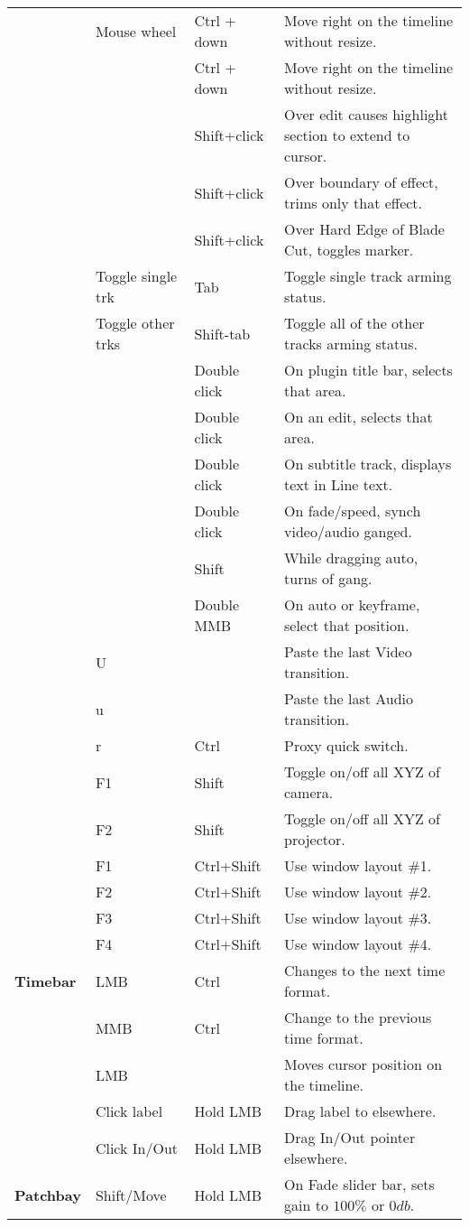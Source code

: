 \begin{longtable}[h]{>{\bfseries}p{}p{}p{}p{}}
  & Mouse wheel & Ctrl + down & Move right on the timeline without resize. \\
  &  & Ctrl + down & Move right on the timeline without resize. \\
  &  & Shift+click & Over edit causes highlight section to extend to cursor. \\
  &  & Shift+click & Over boundary of effect, trims only that effect. \\
  &  & Shift+click & Over Hard Edge of Blade Cut, toggles marker. \\
  & Toggle single trk & Tab & Toggle single track arming status. \\
  & Toggle other trks & Shift-tab & Toggle all of the other tracks arming status. \\
  &  & Double click & On plugin title bar, selects that area. \\
  &  & Double click & On an edit, selects that area. \\
  &  & Double click & On subtitle track, displays text in Line text. \\
  &  & Double click & On fade/speed, synch video/audio ganged. \\
  &  & Shift & While dragging auto, turns of gang. \\
  &  & Double MMB & On auto or keyframe, select that position. \\
  & U &  & Paste the last Video transition. \\
  & u &  & Paste the last Audio transition. \\
  & r & Ctrl & Proxy quick switch. \\
  & F1 & Shift & Toggle on/off all XYZ of camera. \\
  & F2 & Shift & Toggle on/off all XYZ of projector. \\
  & F1 & Ctrl+Shift & Use window layout \#1. \\
  & F2 & Ctrl+Shift & Use window layout \#2. \\
  & F3 & Ctrl+Shift & Use window layout \#3. \\
  & F4 & Ctrl+Shift & Use window layout \#4. \\
  \midrule
  \textcolor{CinBlueText}{Timebar} & LMB & Ctrl & Changes to the next time format. \\
  & MMB & Ctrl & Change to the previous time format. \\
  & LMB &  & Moves cursor position on the timeline. \\
  & Click label & Hold LMB & Drag label to elsewhere. \\
  & Click In/Out & Hold LMB & Drag In/Out pointer elsewhere. \\
  \midrule
  \textcolor{CinBlueText}{Patchbay} & Shift/Move & Hold LMB & On Fade slider bar, sets gain to $100\%$ or $0db$. \\
  \bottomrule
\end{longtable}


